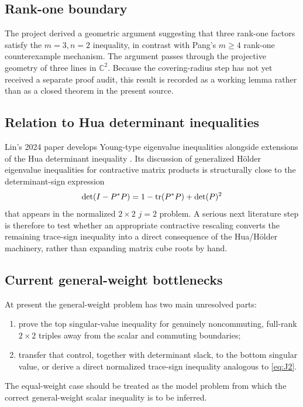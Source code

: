 \subsection{Rank-one boundary}
\statusW{} The project derived a geometric argument suggesting that three rank-one factors satisfy the $m=3,n=2$ inequality, in contrast with Pang's $m\ge4$ rank-one counterexample mechanism.  The argument passes through the projective geometry of three lines in $\mathbb C^2$.  Because the covering-radius step has not yet received a separate proof audit, this result is recorded as a working lemma rather than as a closed theorem in the present source.

\subsection{Relation to Hua determinant inequalities}
Lin's 2024 paper develops Young-type eigenvalue inequalities alongside extensions of the Hua determinant inequality \cite{Lin2024}.  Its discussion of generalized H\"older eigenvalue inequalities for contractive matrix products is structurally close to the determinant-sign expression
\[
\det(I-P^*P)=1-\operatorname{tr}(P^*P)+\det(P)^2
\]
that appears in the normalized $2\times2$ $j=2$ problem.  A serious next literature step is therefore to test whether an appropriate contractive rescaling converts the remaining trace-sign inequality into a direct consequence of the Hua/H\"older machinery, rather than expanding matrix cube roots by hand.

\subsection{Current general-weight bottlenecks}
At present the general-weight problem has two main unresolved parts:
\begin{enumerate}[leftmargin=2.2em]
\item prove the top singular-value inequality for genuinely noncommuting, full-rank $2\times2$ triples away from the scalar and commuting boundaries;
\item transfer that control, together with determinant slack, to the bottom singular value, or derive a direct normalized trace-sign inequality analogous to \eqref{eq:J2}.
\end{enumerate}
The equal-weight case should be treated as the model problem from which the correct general-weight scalar inequality is to be inferred.
